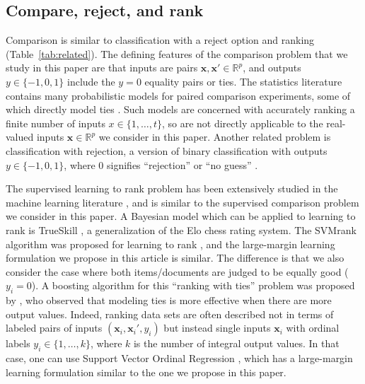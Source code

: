 \documentclass{article}
\newcommand{\RR}{\mathbb R}
\begin{document}
\subsection{Compare, reject, and rank}

Comparison is similar to classification with a reject option and
ranking (Table~\ref{tab:related}). The defining features of the
comparison problem that we study in this paper are that inputs are
pairs $\mathbf x,\mathbf x'\in\RR^p$, and outputs $y\in\{-1,0,1\}$
include the $y=0$ equality pairs or ties.  The statistics literature
contains many probabilistic models for paired comparison experiments,
some of which directly model ties \citep{davidson-ties}. Such models
are concerned with accurately ranking a finite number of inputs
$x\in\{1,\dots,t\}$, so are not directly applicable to the real-valued
inputs $\mathbf x\in\RR^p$ we consider in this paper. Another related
problem is classification with rejection, a version of
binary classification with outputs $y\in\{-1,0,1\}$, where 0 signifies
``rejection'' or ``no guess'' \citep{reject-option}.

The supervised learning to rank problem has been extensively studied
in the machine learning literature \citep{learning-to-rank,
  object-ranking-methods}, and is similar to the supervised comparison
problem we consider in this paper. A Bayesian model which can be
applied to learning to rank is TrueSkill \citep{trueskill}, a
generalization of the Elo chess rating system. The SVMrank algorithm
was proposed for learning to rank \citep{ranksvm}, and the
large-margin learning formulation we propose in this article is
similar. The difference is that we also consider the case where both
items/documents are judged to be equally good ($y_i=0$).  A boosting
algorithm for this ``ranking with ties'' problem was proposed by
\citet{rank-with-ties}, who observed that modeling ties is
more effective when there are more output values. Indeed, ranking data
sets are often described not in terms of labeled pairs of inputs
$(\mathbf x_i, \mathbf x_i', y_i)$ but instead single inputs $\mathbf
x_i$ with ordinal labels $y_i\in\{1,\dots,k\}$, where $k$ is the
number of integral output values. In that case, one can use Support
Vector Ordinal Regression \citep{ordinal}, which has a large-margin
learning formulation similar to the one we propose in this paper.

\end{document}
